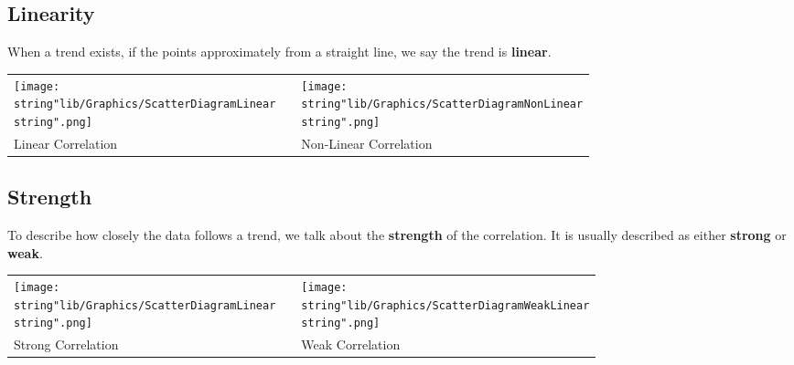 \documentclass[11pt,a4paper]{book}
\begin{document}
\newpage

\subsection{Linearity}

When a trend exists, if the points approximately from a straight line,
we say the trend is \textbf{linear}.
\begin{center}
\begin{tabular}{>{\centering}p{5cm}>{\centering}p{1cm}>{\centering}p{5cm}}
\centering{}\texttt{[image: \\string"lib/Graphics/ScatterDiagramLinear\\string".png]} &  & \centering{}\texttt{[image: \\string"lib/Graphics/ScatterDiagramNonLinear\\string".png]}\tabularnewline
Linear Correlation &  & Non-Linear Correlation\tabularnewline
\end{tabular}
\par\end{center}

\subsection{Strength}

To describe how closely the data follows a trend, we talk about the
\textbf{strength} of the correlation. It is usually described as either
\textbf{strong} or \textbf{weak}.
\begin{center}
\begin{tabular}{>{\centering}p{5cm}>{\centering}p{1cm}>{\centering}p{5cm}}
\centering{}\texttt{[image: \\string"lib/Graphics/ScatterDiagramLinear\\string".png]} &  & \centering{}\texttt{[image: \\string"lib/Graphics/ScatterDiagramWeakLinear\\string".png]}\tabularnewline
Strong Correlation &  & Weak Correlation\tabularnewline
\end{tabular}
\par\end{center}
\end{document}
